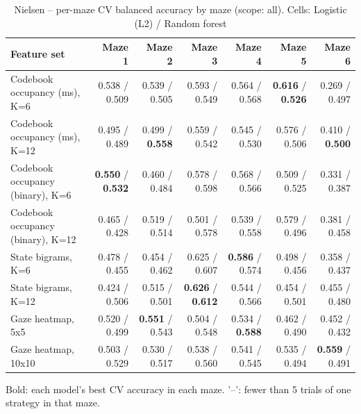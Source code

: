 \begin{table}[t]
\centering
\caption{Nielsen -- per-maze CV balanced accuracy by maze (scope: all). Cells: Logistic (L2) / Random forest}
\label{tab:permaze_by_maze_Nielsen}
\begin{tabular}{lrrrrrr}
\toprule
Feature set & Maze 1 & Maze 2 & Maze 3 & Maze 4 & Maze 5 & Maze 6 \\
\midrule
Codebook occupancy (ms), K=6 & 0.538 / 0.509 & 0.539 / 0.505 & 0.593 / 0.549 & 0.564 / 0.568 & \textbf{0.616} / \textbf{0.526} & 0.269 / 0.497 \\
Codebook occupancy (ms), K=12 & 0.495 / 0.489 & 0.499 / \textbf{0.558} & 0.559 / 0.542 & 0.545 / 0.530 & 0.576 / 0.506 & 0.410 / \textbf{0.500} \\
Codebook occupancy (binary), K=6 & \textbf{0.550} / \textbf{0.532} & 0.460 / 0.484 & 0.578 / 0.598 & 0.568 / 0.566 & 0.509 / 0.525 & 0.331 / 0.387 \\
Codebook occupancy (binary), K=12 & 0.465 / 0.428 & 0.519 / 0.514 & 0.501 / 0.578 & 0.539 / 0.558 & 0.579 / 0.496 & 0.381 / 0.458 \\
State bigrams, K=6 & 0.478 / 0.455 & 0.454 / 0.462 & 0.625 / 0.607 & \textbf{0.586} / 0.574 & 0.498 / 0.456 & 0.358 / 0.437 \\
State bigrams, K=12 & 0.424 / 0.506 & 0.515 / 0.501 & \textbf{0.626} / \textbf{0.612} & 0.544 / 0.566 & 0.454 / 0.501 & 0.455 / 0.480 \\
Gaze heatmap, 5x5 & 0.520 / 0.499 & \textbf{0.551} / 0.543 & 0.504 / 0.548 & 0.534 / \textbf{0.588} & 0.462 / 0.490 & 0.452 / 0.432 \\
Gaze heatmap, 10x10 & 0.503 / 0.529 & 0.530 / 0.517 & 0.538 / 0.560 & 0.541 / 0.545 & 0.535 / 0.494 & \textbf{0.559} / 0.491 \\
\bottomrule
\end{tabular}
\par\smallskip
{\footnotesize Bold: each model's best CV accuracy in each maze. '--': fewer than 5 trials of one strategy in that maze.}
\end{table}
